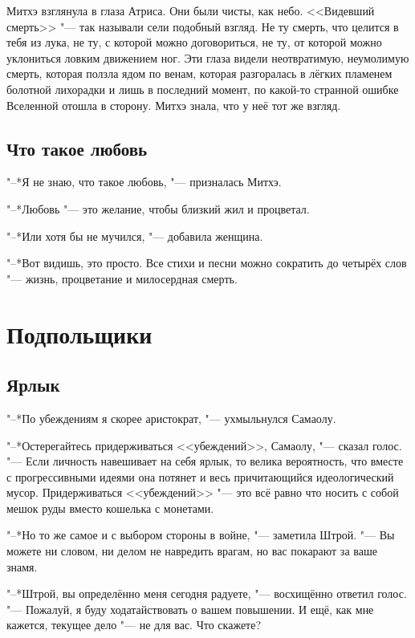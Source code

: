 Митхэ взглянула в глаза Атриса.
Они были чисты, как небо.
<<Видевший смерть>> "--- так называли сели подобный взгляд.
Не ту смерть, что целится в тебя из лука, не ту, с которой можно договориться, не ту, от которой можно уклониться ловким движением ног.
Эти глаза видели неотвратимую, неумолимую смерть, которая ползла ядом по венам, которая разгоралась в лёгких пламенем болотной лихорадки и лишь в последний момент, по какой-то странной ошибке Вселенной отошла в сторону.
Митхэ знала, что у неё тот же взгляд.

\section{Что такое любовь}

"--*Я не знаю, что такое любовь, "--- призналась Митхэ.

"--*Любовь "--- это желание, чтобы близкий жил и процветал.

"--*Или хотя бы не мучился, "--- добавила женщина.

"--*Вот видишь, это просто.
Все стихи и песни можно сократить до четырёх слов "--- жизнь, процветание и милосердная смерть.

\chapter{Подпольщики}

\section{Ярлык}

"--*По убеждениям я скорее аристократ, "--- ухмыльнулся Самаолу.

"--*Остерегайтесь придерживаться <<убеждений>>, Самаолу, "--- сказал голос.
"--- Если личность навешивает на себя ярлык, то велика вероятность, что вместе с прогрессивными идеями она потянет и весь причитающийся идеологический мусор.
Придерживаться <<убеждений>> "--- это всё равно что носить с собой мешок руды вместо кошелька с монетами.

"--*Но то же самое и с выбором стороны в войне, "--- заметила Штрой.
"--- Вы можете ни словом, ни делом не навредить врагам, но вас покарают за ваше знамя.

"--*Штрой, вы определённо меня сегодня радуете, "--- восхищённо ответил голос.
"--- Пожалуй, я буду ходатайствовать о вашем повышении.
И ещё, как мне кажется, текущее дело "--- не для вас.
Что скажете?


